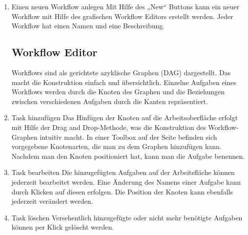         \begin{enumerate}[font={\bfseries}, label={FA\arabic*}0, wide=0pt, labelindent=1em, leftmargin=*]
        
            \item \label{workflowAnlegen:1} Einen neuen Workflow anlegen\newline
            Mit Hilfe des „New“ Buttons kann ein neuer Workflow mit Hilfe des grafischen Workflow Editors erstellt werden. Jeder Workflow hat einen Namen und eine Beschreibung.
            
                \subsection{Workflow Editor}
                Workflows sind als gerichtete azyklische Graphen (DAG) dargestellt. Das macht die Konstruktion einfach und übersichtlich. Einzelne Aufgaben eines Workflows werden durch die Knoten des Graphen und die Beziehungen zwischen verschiedenen Aufgaben durch die Kanten repräsentiert.
            
            \item \label{taskHinzufuegen:1} Task hinzufügen \newline
            Das Hinfügen der Knoten auf die Arbeitsoberfläche erfolgt mit Hilfe der \Gls{Drag and Drop}-Methode, was die Konstruktion des Workflow-Graphen intuitiv macht. In einer Toolbox auf der Seite befinden sich vorgegebene Knotenarten, die man zu dem Graphen hinzufügen kann. Nachdem man den Knoten positioniert hat, kann man die Aufgabe benennen.
        
            \item  \label{taskBearbeiten:1} Task bearbeiten \newline
            Die hinzugefügten Aufgaben auf der Arbeitsfläche können jederzeit bearbeitet werden. Eine Änderung des Namens einer Aufgabe kann durch Klicken auf diesen erfolgen. Die Position der Knoten kann ebenfalls jederzeit verändert werden.
            
            \item \label{taskLoeschen:1} Task löschen \newline
            Versehentlich hinzugefügte oder nicht mehr benötigte Aufgaben können per Klick gelöscht werden.
            

\end{enumerate}
